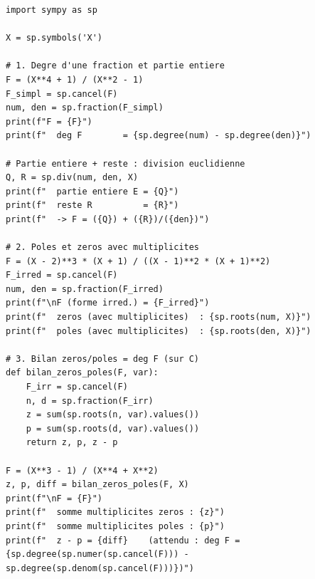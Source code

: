 \begin{lstlisting}
import sympy as sp

X = sp.symbols('X')

# 1. Degre d'une fraction et partie entiere
F = (X**4 + 1) / (X**2 - 1)
F_simpl = sp.cancel(F)
num, den = sp.fraction(F_simpl)
print(f"F = {F}")
print(f"  deg F        = {sp.degree(num) - sp.degree(den)}")

# Partie entiere + reste : division euclidienne
Q, R = sp.div(num, den, X)
print(f"  partie entiere E = {Q}")
print(f"  reste R          = {R}")
print(f"  -> F = ({Q}) + ({R})/({den})")

# 2. Poles et zeros avec multiplicites
F = (X - 2)**3 * (X + 1) / ((X - 1)**2 * (X + 1)**2)
F_irred = sp.cancel(F)
num, den = sp.fraction(F_irred)
print(f"\nF (forme irred.) = {F_irred}")
print(f"  zeros (avec multiplicites)  : {sp.roots(num, X)}")
print(f"  poles (avec multiplicites)  : {sp.roots(den, X)}")

# 3. Bilan zeros/poles = deg F (sur C)
def bilan_zeros_poles(F, var):
    F_irr = sp.cancel(F)
    n, d = sp.fraction(F_irr)
    z = sum(sp.roots(n, var).values())
    p = sum(sp.roots(d, var).values())
    return z, p, z - p

F = (X**3 - 1) / (X**4 + X**2)
z, p, diff = bilan_zeros_poles(F, X)
print(f"\nF = {F}")
print(f"  somme multiplicites zeros : {z}")
print(f"  somme multiplicites poles : {p}")
print(f"  z - p = {diff}    (attendu : deg F = {sp.degree(sp.numer(sp.cancel(F))) - sp.degree(sp.denom(sp.cancel(F)))})")
\end{lstlisting}

